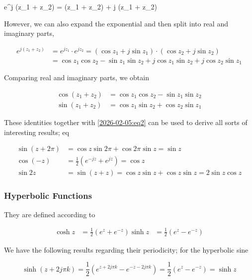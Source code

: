 \bee
e^{j (z_1 + z_2)} = \cos (z_1 + z_2) + j \sin (z_1 + z_2)
\eee

However, we can also expand the exponential and then split into real and imaginary parts,

\begin{align*}
e^{j (z_1 + z_2)} &= e^{j z_1} \cdot e^{j z_2} = (\cos z_1 + j \sin z_1) \cdot (\cos z_2 + j \sin z_2) \\
&= \cos z_1 \cos z_2 - \sin z_1 \sin z_2 + j \cos z_1 \sin z_2 + j \cos z_2 \sin z_1
\end{align*}

Comparing real and imaginary parts, we obtain

\begin{align*}
    \cos (z_1 + z_2) &= \cos z_1 \cos z_2 - \sin z_1 \sin z_2 \\
    \sin (z_1 + z_2) &= \cos z_1 \sin z_2 + \cos z_2 \sin z_1
\end{align*}

These identities together with \eqref{2026-02-05:eq2} can be used to derive all sorts of interesting results; eq

\begin{align*}
    \sin(z + 2 \pi) &= \cos z \sin 2 \pi + \cos 2 \pi \sin z = \sin z \\
    \cos(-z) &= \frac{1}{2} \left( e^{- j z} + e^{j z} \right) = \cos z \\
    \sin 2z &= \sin (z + z) = \cos z \sin z + \cos z \sin z = 2 \sin z \cos z
\end{align*}


\subsubsection{Hyperbolic Functions}

They are defined according to

\begin{align*}
    \cosh z &= \frac{1}{2} \left( e^z + e^{-z} \right)
    \sinh z &= \frac{1}{2} \left( e^z - e^{-z} \right)
\end{align*}

We have the following results regarding their periodicity; for the hyperbolic sine

\begin{equation*}
    \sinh (z + 2j\pi k) = \frac{1}{2} \left( e^{z + 2j\pi k} - e^{- z - 2j\pi k} \right) = \frac{1}{2} \left( e^{z} - e^{- z} \right) = \sinh z
\end{equation*}

